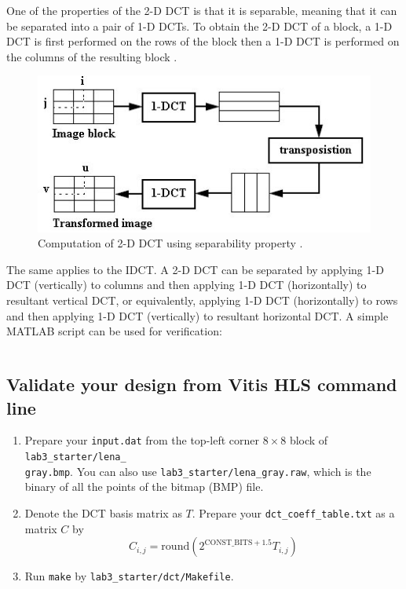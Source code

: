 \documentclass[a4paper,12pt,twoside]{article}
\begin{document}
One of the properties of the 2-D DCT is that it is separable, meaning that it can be separated into a pair of 1-D DCTs. To obtain the 2-D DCT of a block, a 1-D DCT is first performed on the rows of the block then a 1-D DCT is performed on the columns of the resulting block \cite{l11}.
\begin{figure}[H]
    \centering
    \includegraphics[width=\textwidth]{images/11.jpg}
    \caption{Computation of 2-D DCT using separability property \cite{5227881}.}
\end{figure}
The same applies to the IDCT. A 2-D DCT can be separated by applying 1-D DCT (vertically) to columns and then applying 1-D DCT (horizontally) to resultant vertical DCT, or equivalently, applying 1-D DCT (horizontally) to rows and then applying 1-D DCT (vertically) to resultant horizontal DCT. A simple MATLAB script can be used for verification:
\inputminted[linenos]{matlab}{dct_opt.m}
\subsection{Validate your design from Vitis HLS command line}\label{S32}
\begin{enumerate}
    \item Prepare your \texttt{input.dat} from the top-left corner $8\times8$ block of \texttt{lab3\_starter/lena\_\\
    gray.bmp}. You can also use \texttt{lab3\_starter/lena\_gray.raw}, which is the binary of all the points of the bitmap (BMP) file.
    \item Denote the DCT basis matrix as $T$. Prepare your \texttt{dct\_coeff\_table.txt} as a matrix $C$ by
    \begin{equation}
        C_{i,j}=\mathrm{round}(2^{\mathrm{CONST\_BITS}+1.5}T_{i,j})
    \end{equation}
    \item Run \texttt{make} by \texttt{lab3\_starter/dct/Makefile}.
\end{enumerate}
\end{document}
